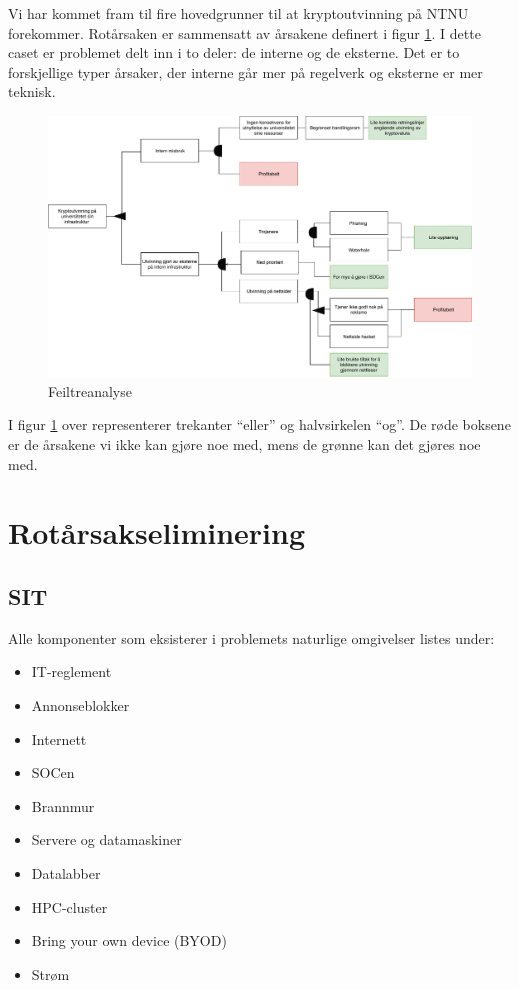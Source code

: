 Vi har kommet fram til fire hovedgrunner til at kryptoutvinning på NTNU forekommer. Rotårsaken er sammensatt av årsakene definert i figur \ref{fig:feil_tre_analyse}. I dette caset er problemet delt inn i to deler: de interne og de eksterne. Det er to forskjellige typer årsaker, der interne går mer på regelverk og eksterne er mer teknisk. 

 \begin{figure}[H]
    \centering
    \includegraphics[scale=0.45]{case_3/bilder/feil_tre_analyse.pdf}
    \caption{Feiltreanalyse}
    \label{fig:feil_tre_analyse}
\end{figure}

I figur \ref{fig:feil_tre_analyse} over representerer trekanter ``eller'' og halvsirkelen ``og''. De røde boksene er de årsakene vi ikke kan gjøre noe med, mens de grønne kan det gjøres noe med.
\section{Rotårsakseliminering}
\subsection{SIT}
Alle komponenter som eksisterer i problemets naturlige omgivelser listes under:

\begin{itemize}
    \item IT-reglement
    \item Annonseblokker
    \item Internett
    \item SOCen
    \item Brannmur
    \item Servere og datamaskiner
    \item Datalabber
    \item HPC-cluster
    \item Bring your own device (BYOD)
    \item Strøm
\end{itemize}

